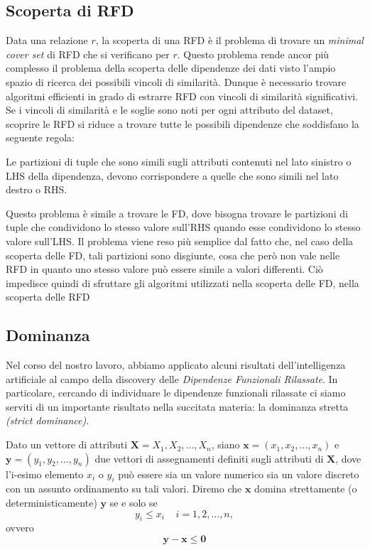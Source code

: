 \subsection{Scoperta di RFD}
Data una relazione $r$, la scoperta di una RFD è il problema di trovare un \textit{minimal cover set} di RFD che si verificano per $r$. Questo problema rende ancor più complesso il problema della scoperta delle dipendenze dei dati visto l'ampio spazio di ricerca dei possibili vincoli di similarità. Dunque è necessario trovare algoritmi efficienti in grado di estrarre RFD con vincoli di similarità significativi.\\
Se i vincoli di similarità e le soglie sono noti per ogni attributo del dataset, scoprire le RFD si riduce a trovare tutte le possibili dipendenze che soddisfano la seguente regola:
\begin{center}
	\begin{lemma}
		Le partizioni di tuple che sono simili sugli attributi contenuti nel lato sinistro o LHS della dipendenza, devono corrispondere a quelle che sono simili nel lato destro o RHS.
	\end{lemma}
\end{center}
Questo problema è simile a trovare le FD, dove bisogna trovare le partizioni di tuple che condividono lo stesso valore sull'RHS quando esse condividono lo stesso valore sull'LHS. Il problema viene reso più semplice dal fatto che, nel caso della scoperta delle FD, tali partizioni sono disgiunte, cosa che però non vale nelle RFD in quanto uno stesso valore può essere simile a valori differenti. Ciò impedisce quindi di sfruttare gli algoritmi utilizzati nella scoperta delle FD, nella scoperta delle RFD
\subsection{Dominanza}
Nel corso del nostro lavoro, abbiamo applicato alcuni risultati dell'intelligenza artificiale al campo della discovery delle \textit{Dipendenze Funzionali Rilassate}. In particolare, cercando di individuare le dipendenze funzionali rilassate ci siamo serviti di un importante risultato nella succitata materia: la dominanza stretta \textit{(strict dominance)}.

\begin{theorem} 
	Dato un vettore di attributi $\mathbf{X} = X_1, X_2, \ldots, X_n $, siano $\mathbf{x} = (x_1, x_2, \ldots, x_n)$ e $\mathbf{y} = (y_1, y_2, \ldots , y_n)$ due vettori di assegnamenti definiti sugli attributi di $\mathbf{X}$, dove l'i-esimo elemento $x_i$ o $y_i$ può essere sia un valore numerico sia un valore discreto con un assunto ordinamento su tali valori. Diremo che $\mathbf{x}$ domina strettamente (o deterministicamente) $\mathbf{y}$ se e solo se $$y_i \leq x_i\;\;\;\;i = 1,2,\ldots,n,$$ ovvero $$\mathbf{y} - \mathbf{x} \leq \mathbf{0}$$
\end{theorem}



